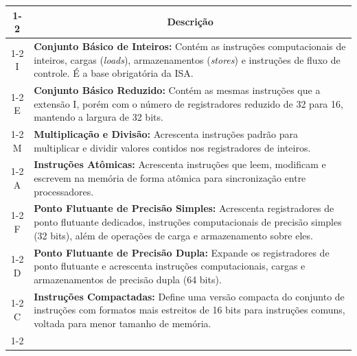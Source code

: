 \begin{tabframed}[htb]%
 \caption{Extensões do conjunto de instruções da arquitetura RISC-V}%
 \label{quad:extensoes_riscv}%
 \renewcommand{\arraystretch}{1.5}
 \begin{tabular}{|c|p{11.5cm}|}
 \cline{1-2}
 \multicolumn{1}{|c|}{\textbf{Extensão}} & \multicolumn{1}{|c|}{\textbf{\centering Descrição}}\\ \cline{1-2}
  I & \textbf{Conjunto Básico de Inteiros:} Contém as instruções computacionais de inteiros, cargas (\textit{loads}), armazenamentos (\textit{stores}) e instruções de fluxo de controle. É a base obrigatória da ISA.\\ \cline{1-2}  
  E & \textbf{Conjunto Básico Reduzido:} Contém as mesmas instruções que a extensão I, porém com o número de registradores reduzido de 32 para 16, mantendo a largura de 32 bits. \\ \cline{1-2}
  M & \textbf{Multiplicação e Divisão:} Acrescenta instruções padrão para multiplicar e dividir valores contidos nos registradores de inteiros.\\ \cline{1-2}  
  A & \textbf{Instruções Atômicas:} Acrescenta instruções que leem, modificam e escrevem na memória de forma atômica para sincronização entre processadores.\\ \cline{1-2}
  F & \textbf{Ponto Flutuante de Precisão Simples:} Acrescenta registradores de ponto flutuante dedicados, instruções computacionais de precisão simples (32 bits), além de operações de carga e armazenamento sobre eles.\\ \cline{1-2}
  D & \textbf{Ponto Flutuante de Precisão Dupla:} Expande os registradores de ponto flutuante e acrescenta instruções computacionais, cargas e armazenamentos de precisão dupla (64 bits).\\ \cline{1-2}
  C & \textbf{Instruções Compactadas:} Define uma versão compacta do conjunto de instruções com formatos mais estreitos de 16 bits para instruções comuns, voltada para menor tamanho de memória.\\ \cline{1-2}
 \end{tabular}
 \end{tabframed}

